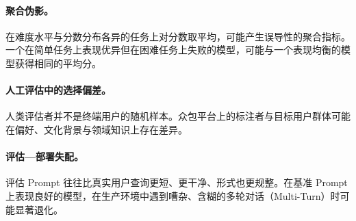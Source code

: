 \paragraph{聚合伪影。}
\label{aggregation-artefacts.}

在难度水平与分数分布各异的任务上对分数取平均，可能产生误导性的聚合指标。一个在简单任务上表现优异但在困难任务上失败的模型，可能与一个表现均衡的模型获得相同的平均分。

\paragraph{人工评估中的选择偏差。}
\label{selection-bias-in-human-evaluation.}

人类评估者并不是终端用户的随机样本。众包平台上的标注者与目标用户群体可能在偏好、文化背景与领域知识上存在差异。

\paragraph{评估—部署失配。}
\label{evaluationdeployment-mismatch.}

评估 Prompt 往往比真实用户查询更短、更干净、形式也更规整。在基准 Prompt 上表现良好的模型，在生产环境中遇到嘈杂、含糊的多轮对话（Multi-Turn）时可能显著退化。

